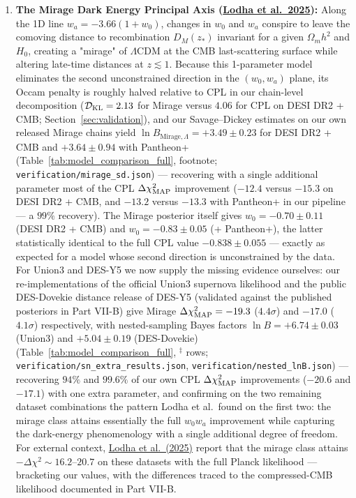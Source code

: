 \documentclass[11pt,letterpaper]{article}
\begin{document}
\begin{enumerate}
    \item \textbf{The Mirage Dark Energy Principal Axis (\href{https://arxiv.org/abs/2503.14743}{Lodha et al.\ 2025}):} Along the 1D line $w_a = -3.66(1 + w_0)$, changes in $w_0$ and $w_a$ conspire to leave the comoving distance to recombination $D_M(z_*)$ invariant for a given $\Omega_m h^2$ and $H_0$, creating a "mirage" of $\Lambda$CDM at the CMB last-scattering surface while altering late-time distances at $z \lesssim 1$. Because this 1-parameter model eliminates the second unconstrained direction in the $(w_0, w_a)$ plane, its Occam penalty is roughly halved relative to CPL in our chain-level decomposition ($\mathcal{D}_{\rm KL} = 2.13$ for Mirage versus $4.06$ for CPL on DESI DR2 + CMB; Section~\ref{sec:validation}), and our Savage--Dickey estimates on our own released Mirage chains yield $\ln B_{\text{Mirage},\Lambda} = +3.49 \pm 0.23$ for DESI DR2 + CMB and $+3.64 \pm 0.94$ with Pantheon+ (Table~\ref{tab:model_comparison_full}, footnote; \texttt{verification/mirage\_sd.json}) --- recovering with a single additional parameter most of the CPL $\Delta\chi^2_{\rm MAP}$ improvement ($-12.4$ versus $-15.3$ on DESI DR2 + CMB, and $-13.2$ versus $-13.3$ with Pantheon+ in our pipeline --- a $99\%$ recovery). The Mirage posterior itself gives $w_0 = -0.70 \pm 0.11$ (DESI DR2 + CMB) and $w_0 = -0.83 \pm 0.05$ (+ Pantheon+), the latter statistically identical to the full CPL value $-0.838 \pm 0.055$ --- exactly as expected for a model whose second direction is unconstrained by the data. For Union3 and DES-Y5 we now supply the missing evidence ourselves: our re-implementations of the official Union3 supernova likelihood and the public DES-Dovekie distance release of DES-Y5 (validated against the published posteriors in Part VII-B) give Mirage $\Delta\chi^2_{\rm MAP} = -19.3$ ($4.4\sigma$) and $-17.0$ ($4.1\sigma$) respectively, with nested-sampling Bayes factors $\ln B = +6.74 \pm 0.03$ (Union3) and $+5.04 \pm 0.19$ (DES-Dovekie) (Table~\ref{tab:model_comparison_full}, $^{\ddagger}$ rows; \texttt{verification/sn\_extra\_results.json}, \texttt{verification/nested\_lnB.json}) --- recovering $94\%$ and $99.6\%$ of our own CPL $\Delta\chi^2_{\rm MAP}$ improvements ($-20.6$ and $-17.1$) with one extra parameter, and confirming on the two remaining dataset combinations the pattern Lodha et al.\ found on the first two: the mirage class attains essentially the full $w_0w_a$ improvement while capturing the dark-energy phenomenology with a single additional degree of freedom. For external context, \href{https://arxiv.org/abs/2503.14743}{Lodha et al.\ (2025)} report that the mirage class attains $-\Delta\chi^2 \sim 16.2\text{--}20.7$ on these datasets with the full Planck likelihood --- bracketing our values, with the differences traced to the compressed-CMB likelihood documented in Part VII-B.

\end{enumerate}
\end{document}
